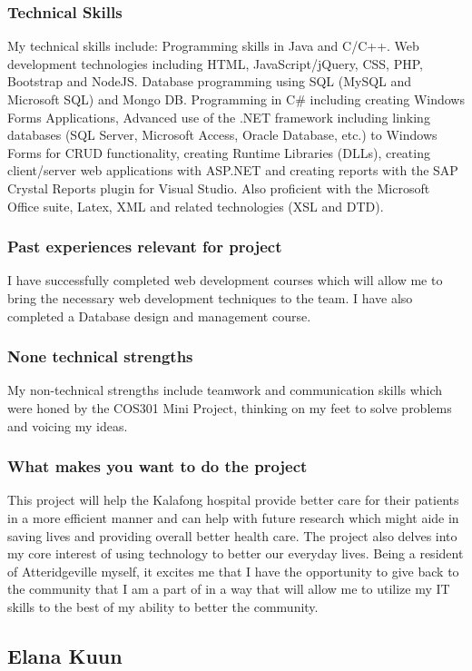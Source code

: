 \documentclass[hidelinks, 12pt, oneside]{article}
\begin{document}
\subsubsection{Technical Skills}
My technical skills include: Programming skills in Java and C/C++. Web development technologies including HTML, JavaScript/jQuery, CSS, PHP, Bootstrap and NodeJS. Database programming using SQL (MySQL and Microsoft SQL) and Mongo DB. Programming in C\# including creating Windows Forms Applications, Advanced use of the .NET framework including linking databases (SQL Server, Microsoft Access, Oracle Database, etc.) to Windows Forms for CRUD functionality, creating Runtime Libraries (DLLs), creating client/server web applications with ASP.NET and creating reports with the SAP Crystal Reports plugin for Visual Studio. Also proficient with the Microsoft Office suite, Latex, XML and related technologies (XSL and DTD).
\subsubsection{Past experiences relevant for project}
I have successfully completed web development courses which will allow me to bring the necessary web development techniques to the team. I have also completed a Database design and management course.
\subsubsection{None technical strengths}
My non-technical strengths include teamwork and communication skills which were honed by the COS301 Mini Project, thinking on my feet to solve problems and voicing my ideas.
\subsubsection{What makes you want to do the project}
This project will help the Kalafong hospital provide better care for their patients in a more efficient manner and can help with future research which might aide in saving lives and providing overall better health care. The project also delves into my core interest of using technology to better our everyday lives. Being a resident of Atteridgeville myself, it excites me that I have the opportunity to give back to the community that I am a part of in a way that will allow me to utilize my IT skills to the best of my ability to better the community.

\subsection{Elana Kuun}
\end{document}

